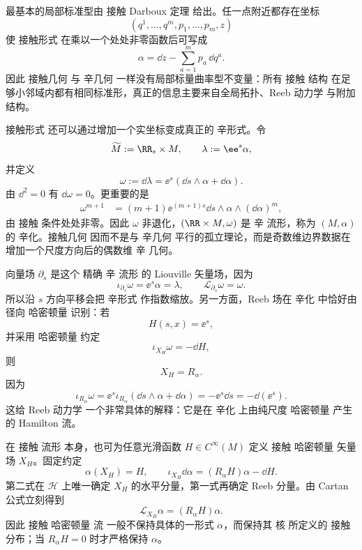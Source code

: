 最基本的局部标准型由 接触 Darboux 定理 给出。任一点附近都存在坐标
\[
(q^1,\ldots,q^m,p_1,\ldots,p_m,z)
\]
使 接触形式 在乘以一个处处非零函数后可写成
\begin{equation*}\alpha
=\dd z-\sum_{a=1}^m p_a\,\dd q^a.\end{equation*}
因此 接触几何 与 辛几何 一样没有局部标量曲率型不变量：所有 接触 结构 在足够小邻域内都有相同标准形，真正的信息主要来自全局拓扑、Reeb 动力学 与附加结构。

接触形式 还可以通过增加一个实坐标变成真正的 辛形式。令
\[
\widetilde M:=\RR_s\times M,
\qquad
\lambda:=\ee^s\alpha,
\]
并定义
\begin{equation}
{
\omega:=\dd\lambda
=\ee^s(\dd s\wedge\alpha+\dd\alpha).
}
\label{eq:math-dg-contact-symplectization}
\end{equation}
由 $\dd^2=0$ 有 $\dd\omega=0$。更重要的是
\begin{align*}
\omega^{m+1}
&=(m+1)\ee^{(m+1)s}
\dd s\wedge\alpha\wedge(\dd\alpha)^m,
\end{align*}
由 接触 条件处处非零。因此 $\omega$ 非退化，$(\RR\times M,\omega)$ 是 辛 流形，称为 $(M,\alpha)$ 的 辛化。接触几何 因而不是与 辛几何 平行的孤立理论，而是奇数维边界数据在增加一个尺度方向后的偶数维 辛 几何。

向量场 $\partial_s$ 是这个 精确 辛 流形 的 Liouville 矢量场，因为
\begin{equation*}\iota_{\partial_s}\omega
=\ee^s\alpha=\lambda,
\qquad
\mathcal L_{\partial_s}\omega=\omega.\end{equation*}
所以沿 $s$ 方向平移会把 辛形式 作指数缩放。另一方面，Reeb 场在 辛化 中恰好由径向 哈密顿量 识别：若
\[
H(s,x)=\ee^s,
\]
并采用 哈密顿量 约定
\[
\iota_{X_H}\omega=-\dd H,
\]
则
\begin{equation*}X_H=R_\alpha.\end{equation*}
因为
\[
\iota_{R_\alpha}\omega
=\ee^s\iota_{R_\alpha}(\dd s\wedge\alpha+\dd\alpha)
=-\ee^s\dd s
=-\dd(\ee^s).
\]
这给 Reeb 动力学 一个非常具体的解释：它是在 辛化 上由纯尺度 哈密顿量 产生的 Hamilton 流。

在 接触 流形 本身，也可为任意光滑函数 $H\in C^\infty(M)$ 定义 接触 哈密顿量 矢量场 $X_H$。固定约定
\begin{equation}
{
\alpha(X_H)=H,
\qquad
\iota_{X_H}\dd\alpha
=(R_\alpha H)\alpha-\dd H.
}
\label{eq:math-dg-contact-hamiltonian}
\end{equation}
第二式在 $\mathcal H$ 上唯一确定 $X_H$ 的水平分量，第一式再确定 Reeb 分量。由 Cartan 公式立刻得到
\begin{equation*}{
\mathcal L_{X_H}\alpha
=(R_\alpha H)\alpha.
}\end{equation*}
因此 接触 哈密顿量 流 一般不保持具体的一形式 $\alpha$，而保持其 核 所定义的 接触 分布；当 $R_\alpha H=0$ 时才严格保持 $\alpha$。

